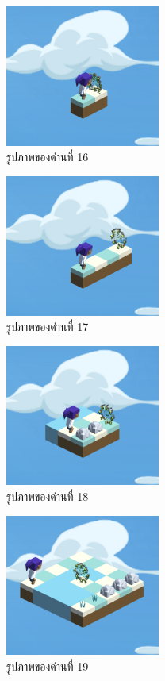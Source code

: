 \begin{figure}[H]
    \begin{center}
    \includegraphics[width=2in]{pic-toro/stage/s16.png}
    \end{center}
    \caption[รูปภาพของด่านที่ 16]{รูปภาพของด่านที่ 16}
    \label{s16}
\end{figure}
\begin{figure}[H]
    \begin{center}
    \includegraphics[width=2in]{pic-toro/stage/s17.png}
    \end{center}
    \caption[รูปภาพของด่านที่ 17]{รูปภาพของด่านที่ 17}
    \label{s17}
\end{figure}
\begin{figure}[H]
    \begin{center}
    \includegraphics[width=2in]{pic-toro/stage/s18.png}
    \end{center}
    \caption[รูปภาพของด่านที่ 18]{รูปภาพของด่านที่ 18}
    \label{s18}
\end{figure}
\begin{figure}[H]
    \begin{center}
    \includegraphics[width=2in]{pic-toro/stage/s19.png}
    \end{center}
    \caption[รูปภาพของด่านที่ 19]{รูปภาพของด่านที่ 19}
    \label{s19}
\end{figure}
